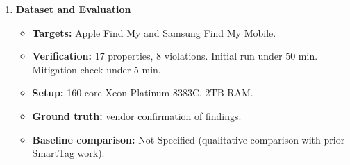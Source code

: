 \documentclass[11pt,a4paper]{article}
\newcommand{\entrypart}[1]{\textbf{\color{accent}#1}\par\vspace{2pt}}
\begin{document}
\begin{enumerate}
    \begin{itemize}
        \item \textbf{Reverse engineering (Samsung)}
        \begin{itemize}
            \item Traffic: Wireshark + nRF52832 sniffer for BLE. BurpSuite for HTTPS (pinning disabled on rooted phones).
            \item SmartTag firmware extracted via voltage-fault injection on Nordic nRF52.
            \item Static: Binary Ninja, JADX, FirmXray. Dynamic: Frida hooks.
            \item Server API testing with crafted requests on own accounts.
            \item Devices: Galaxy S7, Galaxy S9, two SmartTags (firmware 01.01.26, 01.02.06).
        \end{itemize}
        \item \textbf{Apple:} protocol from prior reverse engineering and Apple's 2021 accessory specification.
        \item \textbf{Formal models} in SAPIC+, translated to ProVerif, Tamarin, DeepSec.
        \begin{itemize}
            \item Security goals (P1--P11) taken from vendor documents, plus implicit ones (e.g., ID confidentiality).
            \item ProVerif first (30 min), then Tamarin (24 h) for reachability. DeepSec for unlinkability.
            \item Iterative: fix a violation, re-verify.
        \end{itemize}
        \item \textbf{Mitigations} proposed and formally verified.
    \end{itemize}

    \item \entrypart{Dataset and Evaluation}

    \begin{itemize}
        \item \textbf{Targets:} Apple Find My and Samsung Find My Mobile.
        \item \textbf{Verification:} 17 properties, 8 violations. Initial run under 50 min. Mitigation check under 5 min.
        \item \textbf{Setup:} 160-core Xeon Platinum 8383C, 2TB RAM.
        \item \textbf{Ground truth:} vendor confirmation of findings.
        \item \textbf{Baseline comparison:} Not Specified (qualitative comparison with prior SmartTag work).
    \end{itemize}


\end{enumerate}
\end{document}
